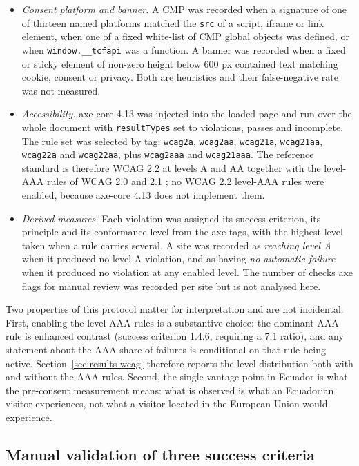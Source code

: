 \documentclass[pdflatex,sn-basic,Numbered,iicol]{sn-jnl}
\theoremstyle{thmstyleone}
\theoremstyle{thmstyletwo}
\theoremstyle{thmstylethree}
\begin{document}
\begin{itemize}
	\item \emph{Consent platform and banner.} A CMP was recorded when a signature of one of thirteen named platforms matched the \verb|src| of a script, iframe or link element, when one of a fixed white-list of CMP global objects was defined, or when \verb|window.__tcfapi| was a function. A banner was recorded when a fixed or sticky element of non-zero height below 600 px contained text matching cookie, consent or privacy. Both are heuristics and their false-negative rate was not measured.
	\item \emph{Accessibility.} axe-core 4.13 \citep{axecore2026} was injected into the loaded page and run over the whole document with \verb|resultTypes| set to violations, passes and incomplete. The rule set was selected by tag: \verb|wcag2a|, \verb|wcag2aa|, \verb|wcag21a|, \verb|wcag21aa|, \verb|wcag22a| and \verb|wcag22aa|, plus \verb|wcag2aaa| and \verb|wcag21aaa|. The reference standard is therefore WCAG 2.2 at levels A and AA \citep{wcag22} together with the level-AAA rules of WCAG 2.0 and 2.1 \citep{wcag20,wcag21}; no WCAG 2.2 level-AAA rules were enabled, because axe-core 4.13 does not implement them.
	\item \emph{Derived measures.} Each violation was assigned its success criterion, its principle and its conformance level from the axe tags, with the highest level taken when a rule carries several. A site was recorded as \emph{reaching level A} when it produced no level-A violation, and as having \emph{no automatic failure} when it produced no violation at any enabled level. The number of checks axe flags for manual review was recorded per site but is not analysed here.
\end{itemize}

Two properties of this protocol matter for interpretation and are not incidental. First, enabling the level-AAA rules is a substantive choice: the dominant AAA rule is enhanced contrast (success criterion 1.4.6, requiring a 7:1 ratio), and any statement about the AAA share of failures is conditional on that rule being active. Section~\ref{sec:results-wcag} therefore reports the level distribution both with and without the AAA rules. Second, the single vantage point in Ecuador is what the pre-consent measurement means: what is observed is what an Ecuadorian visitor experiences, not what a visitor located in the European Union would experience.

\subsection{Manual validation of three success criteria}\label{sec:methods-manual}
\end{document}
